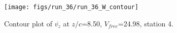\begin{figure}[H]
\centering
\texttt{[image: figs/run\_36/run\_36\_W\_contour]}
\caption{Contour plot of $\overline{v_{z}}$ at $z/c$=8.50, $V_{free}$=24.98, station 4.}
\label{fig:run_36_W_contour}
\end{figure}


